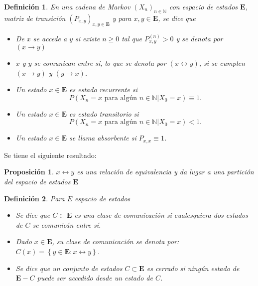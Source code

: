 \documentclass{article}
\newtheorem{Def}{Definición}[section]
\newtheorem{Prop}{Proposición}[section]
\newcommand{\nat}{\mathbb{N}}
\newcommand{\Eb}{\mathbf{E}}
\numberwithin{equation}{section}
\begin{document}
\begin{Def}
En una cadena de Markov $\left(X_{n}\right)_{n\in\nat}$ con espacio de estados $\Eb$, matriz de transici\'on $\left(P_{x,y}\right)_{x,y\in\Eb}$ y para $x,y\in\Eb$,  se dice que
\begin{itemize}
\item[a) ]  De $x$ se accede a $y$ si existe $n\geq0$ tal que $P_{x,y}^{(n)}>0$ y se denota por $\left(x\rightarrow y\right)$

\item[b) ] $x$ y $y$ se comunican entre s\'i, lo que se denota por $\left(x\leftrightarrow y\right)$, si se cumplen $\left(x\rightarrow y\right)$ y $\left(y\rightarrow x\right)$.

\item[c) ] Un estado $x\in\Eb$ es estado recurrente si $$P\left(X_{n}=x\textrm{ para alg\'un }n\in\nat|X_{0}=x \right)\equiv1.$$ 

\item[d) ] Un estado $x\in\Eb$ es estado transitorio si $$P\left(X_{n}=x\textrm{ para alg\'un }n\in\nat|X_{0}=x \right)<1.$$ 

\item[e) ] Un estado $x\in\Eb$ se llama absorbente si $P_{x,x}\equiv1$.
\end{itemize}
\end{Def}

Se tiene el siguiente resultado:

\begin{Prop}
$x\leftrightarrow y$ es una relaci\'on de equivalencia y da lugar a una partici\'on del espacio de estados $\Eb$
\end{Prop}

\begin{Def}
Para $E$ espacio de estados
\begin{itemize}

\item[a)  ] Se dice que $C\subset \Eb$ es una clase de comunicaci\'on si cualesquiera dos estados de $C$ se comunic\'an entre s\'i.

\item[b)  ] Dado $x\in\Eb$, su clase de comunicaci\'on se denota por: $C\left(x\right)=\left\{y\in\Eb:x\leftrightarrow y\right\}$.

\item[c)  ] Se dice que un conjunto de estados  $C\subset \Eb$ es cerrado si ning\'un estado de $\Eb-C$ puede ser accedido desde un estado de $C$.
\end{itemize}
\end{Def}
\end{document}

